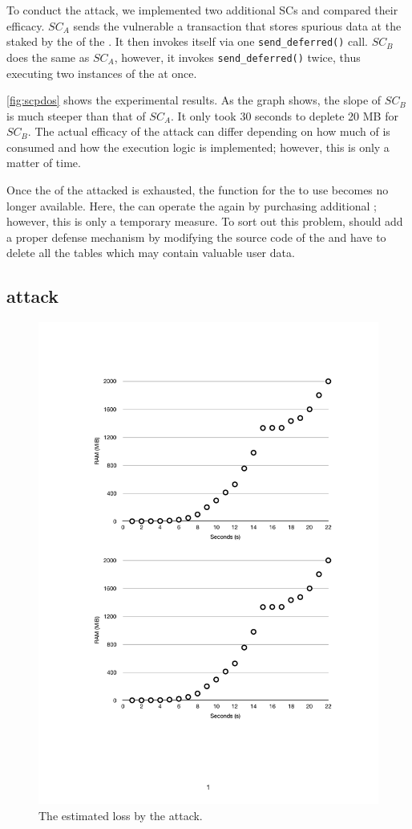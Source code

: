 To conduct the attack, we implemented two additional SCs and compared their
efficacy.
%
$SC_{A}$ sends the vulnerable \SC a transaction that stores spurious data at the
\ram staked by the \SCP of the \SC. It then invokes itself via one
\texttt{send\_deferred()} call. $SC_{B}$ does the same as $SC_{A}$, however, it
invokes \texttt{send\_deferred()} twice, thus executing two instances of the \SC
at once.

\autoref{fig:scpdos} shows the experimental results. As the graph shows, the
slope of $SC_{B}$ is much steeper than that of $SC_{A}$. It only took 30 seconds
to deplete 20 MB for $SC_{B}$.
%
The actual efficacy of the \SCPDOS attack can differ depending on how much
of \ram is consumed and how the execution logic is implemented; however, this is
only a matter of time.

Once the \ram of the attacked \SCP is exhausted, the function for the \SC to use
\ram becomes no longer available.
%
Here, the \SCP can operate the \SC again by purchasing additional \ram; however,
this is only a temporary measure.
%
To sort out this problem, \SCPs should add a proper defense mechanism by
modifying the source code of the \SC and have to delete all the \ram tables
which may contain valuable user data.


\subsection{\TOCTOU attack}
\label{label_toctou}
\begin{figure}[!t] %
\centering
  \includegraphics[width=0.8\linewidth]{figures/RAMSOMWARE_EVAL.pdf}
  \caption{The estimated \ram loss by the \TOCTOU attack.}
  \label{fig:toctou}
\end{figure}

